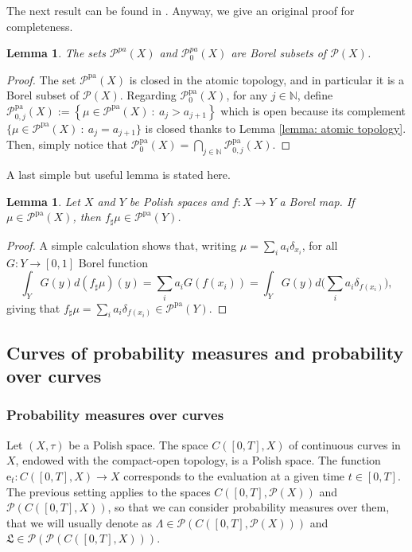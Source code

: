 \documentclass[10pt,leqno]{amsart}
\numberwithin{equation}{section}
\newtheorem{lemma}[teorema]{Lemma}
\newcommand{\N}{\mathbb{N}}
\newcommand{\PP}{\mathcal{P}}
\newcommand{\PPpa}{\PP^{\operatorname{pa}}}
\newcommand{\e}{\mathrm{e}}
\begin{document}
The next result can be found in \cite{delloschiavo2024massive}. Anyway, we give an original proof for completeness. 

\begin{lemma}\label{lemma: pa measures are measurable}
    The sets $\PP^{pa}(X)$ and $\PP^{pa}_0(X)$
    are Borel subsets of $\PP(X)$.
\end{lemma}

\begin{proof}
    The set $\PP^{\operatorname{pa}}(X)$ is closed in the atomic topology, and in particular it is a Borel subset of $\PP(X)$. 
    Regarding $\PP^{\operatorname{pa}}_0(X)$, for any $j\in \N$, define 
    \(\PP^{\operatorname{pa}}_{0,j}(X) := \left\{ \mu\in \PP^{\operatorname{pa}}(X)\ : \ a_j > a_{j+1} \right\} 
    \)
    which is open because its complement $\{\mu \in \PP^{\operatorname{pa}}(X) \ : \ a_j = a_{j+1}\}$ is closed thanks to Lemma \ref{lemma: atomic topology}. Then, simply notice that 
    \(\PP^{\operatorname{pa}}_0(X) = \bigcap_{j\in \N} \PP^{\operatorname{pa}}_{0,j}(X).\)
\end{proof}

A last simple but useful lemma is stated here.

\begin{lemma}\label{lemma: push for of PA meas}
    Let $X$ and $Y$ be Polish spaces and $f:X \to Y$ a Borel map. If $\mu\in \PPpa(X)$, then $f_\sharp \mu \in \PPpa(Y)$.
\end{lemma}
\begin{proof}
    A simple calculation shows that, writing $\mu = \sum_{i} a_i \delta_{x_i}$, for all $G:Y \to [0,1]$ Borel function
    \[\int_Y G(y)d(f_\sharp \mu)(y) = \sum_{i} a_i G(f(x_i)) = \int_Y G(y) d\bigg( \sum_i a_i \delta_{f(x_i)} \bigg),\]
    giving that $f_\sharp\mu = \sum_i a_i \delta_{f(x_i)} \in \PPpa(Y)$.
\end{proof}

\subsection{Curves of probability measures and probability over curves}

\subsubsection{Probability measures over curves}\label{subsub: curves}
Let $(X,\tau)$ be a Polish space. The space $C([0,T],X)$ of continuous curves in $X$, endowed with the compact-open topology, is a Polish space. The function $\e_t: C([0,T],X) \to X$ corresponds to the evaluation at a given time $t\in[0,T]$. 
\\
The previous setting applies to the spaces $C([0,T],\PP(X))$ and $\PP(C([0,T],X))$, so that we can consider probability measures over them, that we will usually denote as $\Lambda \in \PP(C([0,T],\PP(X)))$ and $\mathfrak{L}\in \PP(\PP(C([0,T],X)))$.
\end{document}

